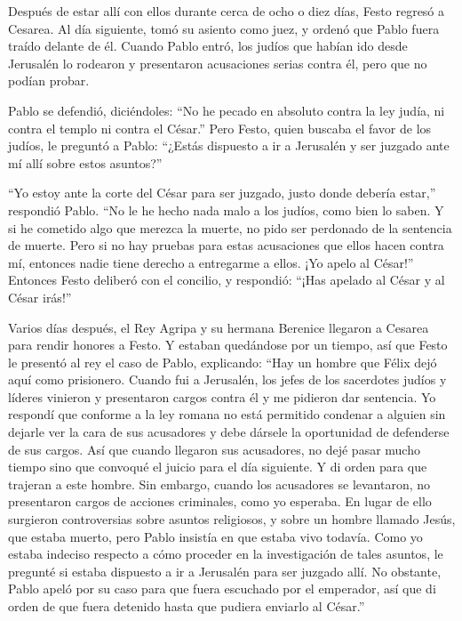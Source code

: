  Después de estar allí con ellos durante cerca de ocho o
diez días, Festo regresó a Cesarea. Al día siguiente, tomó su asiento
como juez, y ordenó que Pablo fuera traído delante de él. 
Cuando Pablo entró, los judíos que habían ido desde Jerusalén lo
rodearon y presentaron acusaciones serias contra él, pero que no podían
probar.

 Pablo se defendió, diciéndoles: ``No he pecado en absoluto
contra la ley judía, ni contra el templo ni contra el César.''
 Pero Festo, quien buscaba el favor de los judíos, le
preguntó a Pablo: ``¿Estás dispuesto a ir a Jerusalén y ser juzgado ante
mí allí sobre estos asuntos?''

 ``Yo estoy ante la corte del César para ser juzgado, justo
donde debería estar,'' respondió Pablo. ``No le he hecho nada malo a los
judíos, como bien lo saben.  Y si he cometido algo que
merezca la muerte, no pido ser perdonado de la sentencia de muerte. Pero
si no hay pruebas para estas acusaciones que ellos hacen contra mí,
entonces nadie tiene derecho a entregarme a ellos. ¡Yo apelo al César!''
 Entonces Festo deliberó con el concilio, y respondió:
``¡Has apelado al César y al César irás!''

 Varios días después, el Rey Agripa y su hermana Berenice
llegaron a Cesarea para rendir honores a Festo.  Y estaban
quedándose por un tiempo, así que Festo le presentó al rey el caso de
Pablo, explicando: ``Hay un hombre que Félix dejó aquí como prisionero.
 Cuando fui a Jerusalén, los jefes de los sacerdotes judíos
y líderes vinieron y presentaron cargos contra él y me pidieron dar
sentencia.  Yo respondí que conforme a la ley romana no
está permitido condenar a alguien sin dejarle ver la cara de sus
acusadores y debe dársele la oportunidad de defenderse de sus cargos.
 Así que cuando llegaron sus acusadores, no dejé pasar
mucho tiempo sino que convoqué el juicio para el día siguiente. Y di
orden para que trajeran a este hombre.  Sin embargo, cuando
los acusadores se levantaron, no presentaron cargos de acciones
criminales, como yo esperaba.  En lugar de ello surgieron
controversias sobre asuntos religiosos, y sobre un hombre llamado Jesús,
que estaba muerto, pero Pablo insistía en que estaba vivo todavía.
 Como yo estaba indeciso respecto a cómo proceder en la
investigación de tales asuntos, le pregunté si estaba dispuesto a ir a
Jerusalén para ser juzgado allí.  No obstante, Pablo apeló
por su caso para que fuera escuchado por el emperador, así que di orden
de que fuera detenido hasta que pudiera enviarlo al César.''

